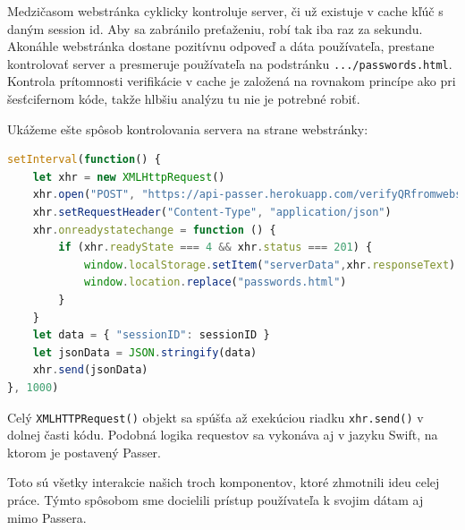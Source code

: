 Medzičasom webstránka cyklicky kontroluje server, či už existuje v cache kľúč s daným session id. Aby sa zabránilo preťaženiu, robí tak iba raz za sekundu. Akonáhle webstránka dostane pozitívnu odpoveď a dáta používateľa, prestane kontrolovať server a presmeruje používateľa na podstránku \texttt{.../passwords.html}. Kontrola prítomnosti verifikácie v cache je založená na rovnakom princípe ako pri šesťcifernom kóde, takže hlbšiu analýzu tu nie je potrebné robiť.

Ukážeme ešte spôsob kontrolovania servera na strane webstránky:
\newline
\begin{lstlisting}[language=JavaScript, basicstyle=\small]
setInterval(function() {
    let xhr = new XMLHttpRequest()
    xhr.open("POST", "https://api-passer.herokuapp.com/verifyQRfromwebsite", true)
    xhr.setRequestHeader("Content-Type", "application/json")
    xhr.onreadystatechange = function () {
        if (xhr.readyState === 4 && xhr.status === 201) {
            window.localStorage.setItem("serverData",xhr.responseText)
            window.location.replace("passwords.html")
        }
    }
    let data = { "sessionID": sessionID }
    let jsonData = JSON.stringify(data)
    xhr.send(jsonData)
}, 1000) 
\end{lstlisting}
\leavevmode\newline
\indent Celý \texttt{XMLHTTPRequest()} objekt sa spúšťa až exekúciou riadku \texttt{xhr.send()} v dolnej časti kódu. Podobná logika requestov sa vykonáva aj v jazyku Swift, na ktorom je postavený Passer.

\leavevmode\newline
\indent Toto sú všetky interakcie našich troch komponentov, ktoré zhmotnili ideu celej práce. Týmto spôsobom sme docielili prístup používateľa k svojim dátam aj mimo Passera.